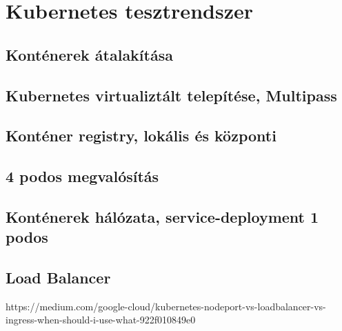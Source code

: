 
\chapter{Kubernetes tesztrendszer}

\section{Konténerek átalakítása}

\section{Kubernetes virtualiztált telepítése, Multipass}

\section{Konténer registry, lokális és központi}

\section{4 podos megvalósítás}

\section{Konténerek hálózata, service-deployment 1 podos}

\section{Load Balancer}
https://medium.com/google-cloud/kubernetes-nodeport-vs-loadbalancer-vs-ingress-when-should-i-use-what-922f010849e0
